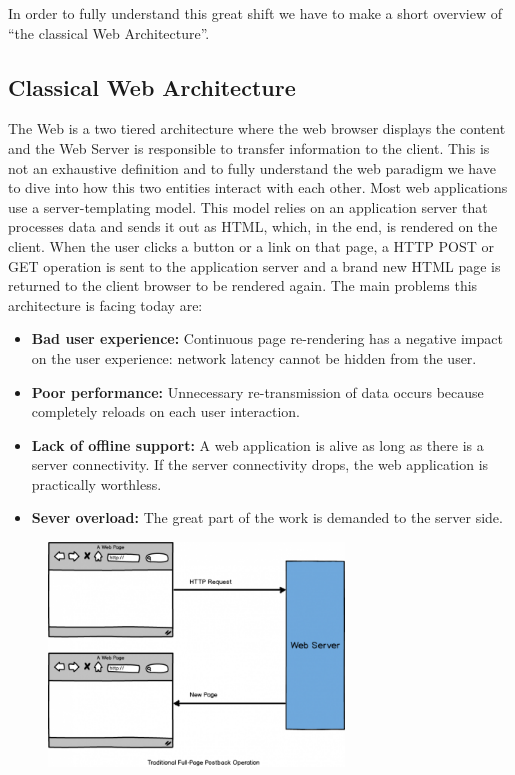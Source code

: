 \documentclass[a4paper,13pt]{report}
\begin{document}
In order to fully understand this great shift we have to make a short overview of ``the classical Web Architecture''.
\subsection{Classical Web Architecture}
The Web is a two tiered architecture where the web browser displays the content and the Web Server is responsible to transfer information to the client.
This is not an exhaustive definition and to fully understand the web paradigm we have to dive into how this two entities interact with each other.
Most web applications use a server-templating model. This model relies on an application server that processes data and sends it out as HTML, which, in the end, is rendered on the client. When the user clicks a button or a link on that page, a HTTP POST or GET operation is sent to  the application server and a brand new HTML page is returned to the client browser to be rendered again.\newline
The main problems this architecture is facing today are:
\begin{itemize}
\item \textbf{Bad user experience: } Continuous page re-rendering has a negative impact on the user experience: network latency cannot be hidden from the user.
\item \textbf{Poor performance: } Unnecessary re-transmission of data occurs because completely reloads on each user interaction.
\item \textbf{Lack of offline support: }A web application is alive as long as there is a server connectivity. If the server connectivity drops, the web application is practically worthless.
\item \textbf{Sever overload: } The great part of the work is demanded to the server side. 
\end{itemize}

\begin{figure}[H]
  \centering
    \includegraphics[width=0.7\textwidth]{pics/architecture}
\end{figure}
\end{document}
